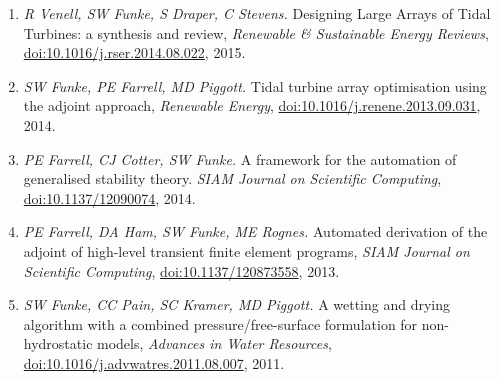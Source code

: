 \documentclass[11pt]{article}
\begin{document}
\begin{enumerate}
\item \textit{R Venell, SW Funke, S Draper, C Stevens.} Designing Large Arrays of Tidal Turbines: a synthesis and review, \textit{Renewable \& Sustainable Energy Reviews}, \href{https://doi.org/10.1016/j.rser.2014.08.022}{doi:10.1016/j.rser.2014.08.022}, 2015.
\item \textit{SW Funke, PE Farrell, MD Piggott.} Tidal turbine array optimisation using the adjoint approach, \textit{Renewable Energy}, \href{https://doi.org/10.1016/j.renene.2013.09.031}{doi:10.1016/j.renene.2013.09.031}, 2014.
\item \textit{PE Farrell, CJ Cotter, SW Funke.} A framework for the automation of generalised stability theory. \textit{SIAM Journal on     Scientific Computing}, \href{https://doi.org/10.1016/10.1137/12090074}{doi:10.1137/12090074}, 2014.
\item \textit{PE Farrell, DA Ham, SW Funke, ME Rognes.} Automated derivation of the adjoint of high-level transient finite element programs, \textit{SIAM Journal on Scientific Computing}, \href{https://doi.org/10.1016/10.1137/120873558}{doi:10.1137/120873558}, 2013.
\item \textit{SW Funke, CC Pain, SC Kramer, MD Piggott.} A wetting and drying algorithm with a combined pressure/free-surface formulation for non-hydrostatic models, \textit{Advances in Water Resources}, \href{https://doi.org/10.1016/j.advwatres.2011.08.007}{doi:10.1016/j.advwatres.2011.08.007}, 2011.
\end{enumerate}
\end{document}
